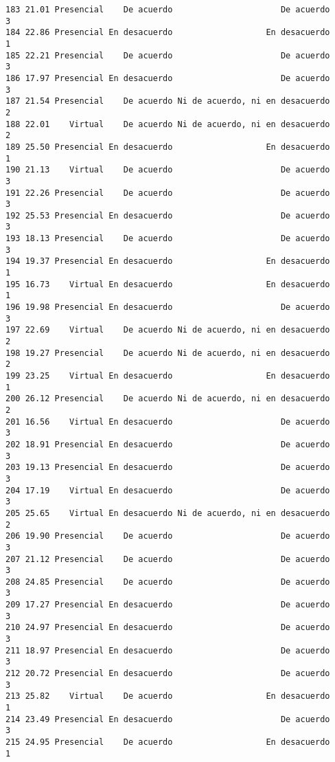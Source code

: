 \documentclass[
  letterpaper,
  DIV=11,
  numbers=noendperiod]{scrartcl}
\begin{document}
\begin{verbatim}
183 21.01 Presencial    De acuerdo                      De acuerdo           3
184 22.86 Presencial En desacuerdo                   En desacuerdo           1
185 22.21 Presencial    De acuerdo                      De acuerdo           3
186 17.97 Presencial En desacuerdo                      De acuerdo           3
187 21.54 Presencial    De acuerdo Ni de acuerdo, ni en desacuerdo           2
188 22.01    Virtual    De acuerdo Ni de acuerdo, ni en desacuerdo           2
189 25.50 Presencial En desacuerdo                   En desacuerdo           1
190 21.13    Virtual    De acuerdo                      De acuerdo           3
191 22.26 Presencial    De acuerdo                      De acuerdo           3
192 25.53 Presencial En desacuerdo                      De acuerdo           3
193 18.13 Presencial    De acuerdo                      De acuerdo           3
194 19.37 Presencial En desacuerdo                   En desacuerdo           1
195 16.73    Virtual En desacuerdo                   En desacuerdo           1
196 19.98 Presencial En desacuerdo                      De acuerdo           3
197 22.69    Virtual    De acuerdo Ni de acuerdo, ni en desacuerdo           2
198 19.27 Presencial    De acuerdo Ni de acuerdo, ni en desacuerdo           2
199 23.25    Virtual En desacuerdo                   En desacuerdo           1
200 26.12 Presencial    De acuerdo Ni de acuerdo, ni en desacuerdo           2
201 16.56    Virtual En desacuerdo                      De acuerdo           3
202 18.91 Presencial En desacuerdo                      De acuerdo           3
203 19.13 Presencial En desacuerdo                      De acuerdo           3
204 17.19    Virtual En desacuerdo                      De acuerdo           3
205 25.65    Virtual En desacuerdo Ni de acuerdo, ni en desacuerdo           2
206 19.90 Presencial    De acuerdo                      De acuerdo           3
207 21.12 Presencial    De acuerdo                      De acuerdo           3
208 24.85 Presencial    De acuerdo                      De acuerdo           3
209 17.27 Presencial En desacuerdo                      De acuerdo           3
210 24.97 Presencial En desacuerdo                      De acuerdo           3
211 18.97 Presencial En desacuerdo                      De acuerdo           3
212 20.72 Presencial En desacuerdo                      De acuerdo           3
213 25.82    Virtual    De acuerdo                   En desacuerdo           1
214 23.49 Presencial En desacuerdo                      De acuerdo           3
215 24.95 Presencial    De acuerdo                   En desacuerdo           1

\end{verbatim}
\end{document}
